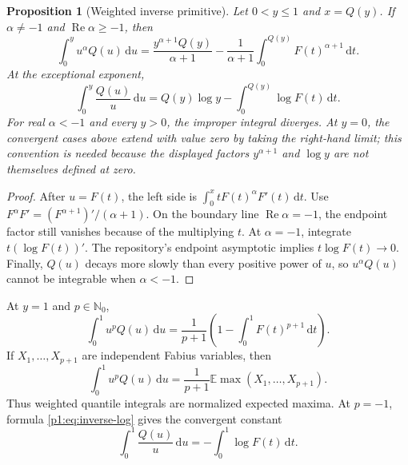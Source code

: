 \documentclass[11pt,oneside]{article}
\newtheorem{proposition}[theorem]{Proposition}
\theoremstyle{definition}
\theoremstyle{remark}
\newcommand{\E}{\mathbb E}
\newcommand{\N}{\mathbb N}
\newcommand{\dd}{\,\mathrm d}
\newcommand{\1}{\mathbf 1}
\DeclareMathOperator{\Rea}{Re}
\begin{document}
\begin{proposition}[Weighted inverse primitive]\label{p1:prop:inverse-weighted}
Let \(0<y\leq1\) and \(x=Q(y)\).  If \(\alpha\neq-1\) and
\(\Rea\alpha\geq-1\), then
\begin{equation}
 \boxed{\quad
 \int_0^yu^\alpha Q(u)\dd u
 =\frac{y^{\alpha+1}Q(y)}{\alpha+1}
 -\frac1{\alpha+1}\int_0^{Q(y)}F(t)^{\alpha+1}\dd t.
 \quad}                                                        \label{p1:eq:inverse-weighted}
\end{equation}
At the exceptional exponent,
\begin{equation}
 \boxed{\quad
 \int_0^y\frac{Q(u)}u\dd u
 =Q(y)\log y-\int_0^{Q(y)}\log F(t)\dd t.
 \quad}                                                        \label{p1:eq:inverse-log}
\end{equation}
For real \(\alpha<-1\) and every \(y>0\), the improper integral diverges.
At \(y=0\), the convergent cases above extend with value zero by taking the
right-hand limit; this convention is needed because the displayed factors
\(y^{\alpha+1}\) and \(\log y\) are not themselves defined at zero.
\end{proposition}

\begin{proof}
After \(u=F(t)\), the left side is
\(\int_0^xtF(t)^\alpha F'(t)\dd t\).  Use
\(F^\alpha F'=(F^{\alpha+1})'/(\alpha+1)\).  On the boundary line
\(\Rea\alpha=-1\), the endpoint factor still vanishes because of the
multiplying \(t\).  At \(\alpha=-1\), integrate
\(t(\log F(t))'\).  The repository's endpoint asymptotic implies
\(t\log F(t)\to0\).  Finally, \(Q(u)\) decays more slowly than every positive
power of \(u\), so \(u^\alpha Q(u)\) cannot be integrable when
\(\alpha<-1\).
\end{proof}

At \(y=1\) and \(p\in\N_0\),
\begin{equation}
 \boxed{\quad
 \int_0^1u^pQ(u)\dd u
 =\frac1{p+1}\left(1-\int_0^1F(t)^{p+1}\dd t\right).
 \quad}                                                        \label{p1:eq:inverse-definite-p}
\end{equation}
If \(X_1,\ldots,X_{p+1}\) are independent Fabius variables, then
\begin{equation}
 \int_0^1u^pQ(u)\dd u
 =\frac1{p+1}\E\max(X_1,\ldots,X_{p+1}).                       \label{p1:eq:inverse-order-stat}
\end{equation}
Thus weighted quantile integrals are normalized expected maxima.
At \(p=-1\), formula \eqref{p1:eq:inverse-log} gives the convergent constant
\begin{equation}
 \int_0^1\frac{Q(u)}u\dd u=-\int_0^1\log F(t)\dd t.            \label{p1:eq:inverse-log-constant}
\end{equation}
\end{document}
